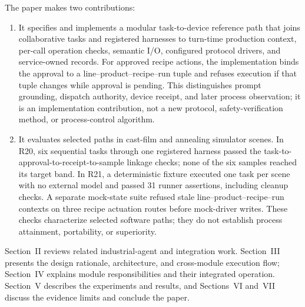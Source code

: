 The paper makes two contributions:
\begin{enumerate}
\item It specifies and implements a modular task-to-device reference path that
  joins collaborative tasks and registered harnesses to turn-time production
  context, per-call operation checks, semantic I/O, configured protocol
  drivers, and service-owned records. For approved recipe actions, the
  implementation binds the approval to a line--product--recipe--run tuple and
  refuses execution if that tuple changes while approval is pending. This
  distinguishes prompt grounding, dispatch authority, device receipt, and
  later process observation; it is an implementation contribution, not a new
  protocol, safety-verification method, or process-control algorithm.
\item It evaluates selected paths in cast-film and annealing simulator scenes.
  In R20, six sequential tasks through one registered harness passed the
  task-to-approval-to-receipt-to-sample linkage checks; none of the six samples
  reached its target band. In R21, a deterministic fixture executed one task
  per scene with no external model and passed 31 runner assertions, including
  cleanup checks. A separate mock-state suite refused stale
  line--product--recipe--run contexts on three recipe actuation routes before
  mock-driver writes. These checks characterize selected software paths; they
  do not establish process attainment, portability, or superiority.
\end{enumerate}

Section~II reviews related industrial-agent and integration work.
Section~III presents the design rationale, architecture, and cross-module
execution flow; Section~IV explains module responsibilities and their
integrated operation. Section~V describes the experiments and results, and
Sections~VI and~VII discuss the evidence limits and conclude the paper.
